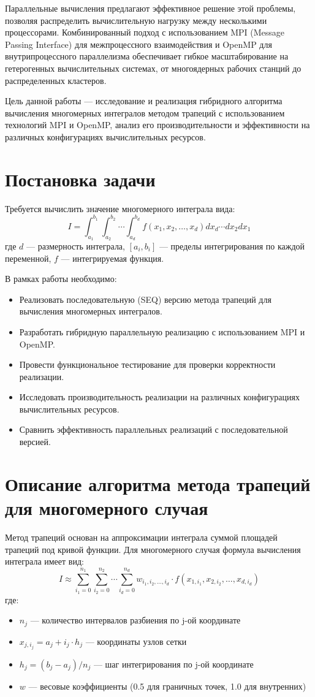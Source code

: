 \documentclass[a4paper,12pt]{article}
\begin{document}
Параллельные вычисления предлагают эффективное решение этой проблемы, позволяя распределить вычислительную нагрузку между несколькими процессорами. 
Комбинированный подход с использованием MPI (Message Passing Interface) для межпроцессного взаимодействия и OpenMP для внутрипроцессного параллелизма обеспечивает гибкое масштабирование на гетерогенных вычислительных системах, 
от многоядерных рабочих станций до распределенных кластеров.

Цель данной работы — исследование и реализация гибридного алгоритма вычисления многомерных интегралов методом трапеций с использованием технологий MPI и OpenMP, 
анализ его производительности и эффективности на различных конфигурациях вычислительных ресурсов.

\section*{Постановка задачи}
Требуется вычислить значение многомерного интеграла вида:
\[
I = \int_{a_1}^{b_1} \int_{a_2}^{b_2} \cdots \int_{a_d}^{b_d} f(x_1, x_2, \ldots, x_d)  dx_d \cdots dx_2 dx_1
\]
где \(d\) — размерность интеграла, \([a_i, b_i]\) — пределы интегрирования по каждой переменной, \(f\) — интегрируемая функция.

В рамках работы необходимо:

\begin{itemize}
    \item Реализовать последовательную (SEQ) версию метода трапеций для вычисления многомерных интегралов.
    \item Разработать гибридную параллельную реализацию с использованием MPI и OpenMP.
    \item Провести функциональное тестирование для проверки корректности реализации.
    \item Исследовать производительность реализации на различных конфигурациях вычислительных ресурсов.
    \item Сравнить эффективность параллельных реализаций с последовательной версией.
\end{itemize}

\section*{Описание алгоритма метода трапеций для многомерного случая}
Метод трапеций основан на аппроксимации интеграла суммой площадей трапеций под кривой функции. 
Для многомерного случая формула вычисления интеграла имеет вид:
\[
I \approx \sum_{i_1=0}^{n_1} \sum_{i_2=0}^{n_2} \cdots \sum_{i_d=0}^{n_d} w_{i_1,i_2,\ldots,i_d} \cdot f(x_{1,i_1}, x_{2,i_2}, \ldots, x_{d,i_d})
\]
где:
\begin{itemize}
    \item \(n_j\) — количество интервалов разбиения по j-ой координате
    \item \(x_{j,i_j} = a_j + i_j \cdot h_j\) — координаты узлов сетки
    \item \(h_j = (b_j - a_j) / n_j\) — шаг интегрирования по j-ой координате
    \item \(w\) — весовые коэффициенты (0.5 для граничных точек, 1.0 для внутренних)
\end{itemize}
\end{document}
